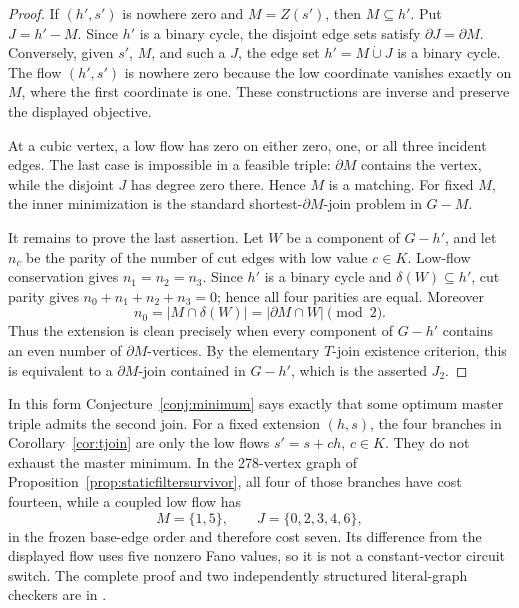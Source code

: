 \documentclass[11pt]{article}
\theoremstyle{definition}
\theoremstyle{remark}
\begin{document}
\begin{proof}
If \((h',s')\) is nowhere zero and \(M=Z(s')\), then \(M\subseteq h'\).
Put \(J=h'-M\).  Since \(h'\) is a binary cycle, the disjoint edge sets
satisfy \(\partial J=\partial M\).  Conversely, given \(s'\), \(M\), and
such a \(J\), the edge set \(h'=M\mathbin{\dot\cup}J\) is a binary cycle.
The flow \((h',s')\) is nowhere zero because the low coordinate vanishes
exactly on \(M\), where the first coordinate is one.  These constructions
are inverse and preserve the displayed objective.

At a cubic vertex, a low flow has zero on either zero, one, or all three
incident edges.  The last case is impossible in a feasible triple:
\(\partial M\) contains the vertex, while the disjoint \(J\) has degree
zero there.  Hence \(M\) is a matching.  For fixed \(M\), the inner
minimization is the standard shortest-\(\partial M\)-join problem in
\(G-M\).

It remains to prove the last assertion.  Let \(W\) be a component of
\(G-h'\), and let \(n_c\) be the parity of the number of cut edges with
low value \(c\in K\).  Low-flow conservation gives
\(n_1=n_2=n_3\).  Since \(h'\) is a binary cycle and
\(\delta(W)\subseteq h'\), cut parity gives
\(n_0+n_1+n_2+n_3=0\); hence all four parities are equal.  Moreover
\[
 n_0=|M\cap\delta(W)|=|\partial M\cap W|\pmod2.
\]
Thus the extension is clean precisely when every component of \(G-h'\)
contains an even number of \(\partial M\)-vertices.  By the elementary
\(T\)-join existence criterion, this is equivalent to a
\(\partial M\)-join contained in \(G-h'\), which is the asserted \(J_2\).
\end{proof}

In this form Conjecture~\ref{conj:minimum} says exactly that some optimum
master triple admits the second join.  For a fixed extension
\((h,s)\), the four branches in Corollary~\ref{cor:tjoin} are only the
low flows \(s'=s+ch\), \(c\in K\).  They do not exhaust the master
minimum.  In the 278-vertex graph of
Proposition~\ref{prop:staticfiltersurvivor}, all four of those branches
have cost fourteen, while a coupled low flow has
\[
                 M=\{1,5\},\qquad J=\{0,2,3,4,6\},
\]
in the frozen base-edge order and therefore cost seven.  Its difference
from the displayed flow uses five nonzero Fano values, so it is not a
constant-vector circuit switch.  The complete proof and two independently
structured literal-graph checkers are in
\allowbreak
{}.
\end{document}
